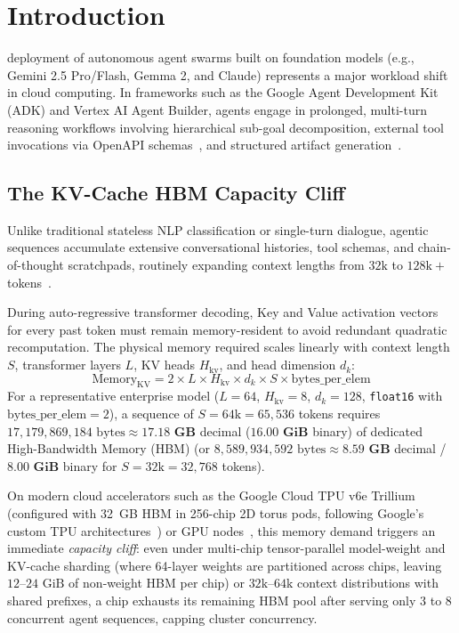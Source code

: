 \documentclass[conference,10pt]{IEEEtran}
\begin{document}
\section{Introduction}
 deployment of autonomous agent swarms built on foundation models (e.g., Gemini 2.5 Pro/Flash, Gemma 2, and Claude) represents a major workload shift in cloud computing. In frameworks such as the Google Agent Development Kit (ADK) and Vertex AI Agent Builder, agents engage in prolonged, multi-turn reasoning workflows involving hierarchical sub-goal decomposition, external tool invocations via OpenAPI schemas~\cite{patil2024gorilla}, and structured artifact generation~\cite{zheng2024sglang, gao2024cachedattention}.

\subsection{The KV-Cache HBM Capacity Cliff}
Unlike traditional stateless NLP classification or single-turn dialogue, agentic sequences accumulate extensive conversational histories, tool schemas, and chain-of-thought scratchpads, routinely expanding context lengths from $32\text{k}$ to $128\text{k}+$ tokens~\cite{kwon2023efficient, xiao2023efficient}.

During auto-regressive transformer decoding, Key and Value activation vectors for every past token must remain memory-resident to avoid redundant quadratic recomputation. The physical memory required scales linearly with context length $S$, transformer layers $L$, KV heads $H_{\text{kv}}$, and head dimension $d_k$:
\begin{equation}
\label{eq:kv_footprint}
\text{Memory}_{\text{KV}} = 2 \times L \times H_{\text{kv}} \times d_k \times S \times \text{bytes\_per\_elem}
\end{equation}
For a representative enterprise model ($L=64$, $H_{\text{kv}}=8$, $d_k=128$, \texttt{float16} with $\text{bytes\_per\_elem}=2$), a sequence of $S = 64\text{k} = 65{,}536$ tokens requires $17{,}179{,}869{,}184\text{ bytes} \approx \mathbf{17.18\text{ GB}}$ decimal ($\mathbf{16.00\text{ GiB}}$ binary) of dedicated High-Bandwidth Memory (HBM) (or $8{,}589{,}934{,}592\text{ bytes} \approx \mathbf{8.59\text{ GB}}$ decimal / $\mathbf{8.00\text{ GiB}}$ binary for $S = 32\text{k} = 32{,}768$ tokens).

On modern cloud accelerators such as the Google Cloud TPU v6e Trillium (configured with 32~GB HBM in 256-chip 2D torus pods, following Google's custom TPU architectures~\cite{jouppi2023tpu}) or GPU nodes~\cite{sheng2023flexgen}, this memory demand triggers an immediate \textit{capacity cliff}: even under multi-chip tensor-parallel model-weight and KV-cache sharding (where 64-layer weights are partitioned across chips, leaving $12\text{--}24\text{ GiB}$ of non-weight HBM per chip) or $32\text{k}\text{--}64\text{k}$ context distributions with shared prefixes, a chip exhausts its remaining HBM pool after serving only 3 to 8 concurrent agent sequences, capping cluster concurrency.
\end{document}
